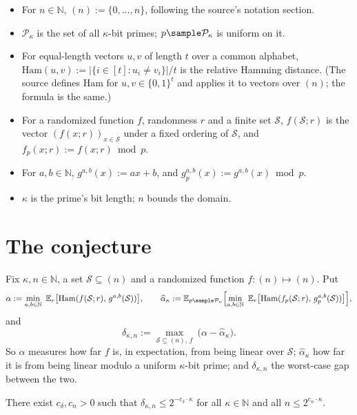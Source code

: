 \documentclass{conjura-conjecture}
\newcommand{\N}{\mathbb{N}}
\newcommand{\Ham}{\mathrm{Ham}}
\newcommand{\Prm}{\mathcal{P}}
\newcommand{\Sc}{\mathcal{S}}
\begin{document}
\begin{itemize}[nosep]
  \item For $n \in \N$, $(n) := \{0, \dots, n\}$, following the source's
    notation section.
  \item $\Prm_{\kappa}$ is the set of all $\kappa$-bit primes; $p
    \sample \Prm_{\kappa}$ is uniform on it.
  \item For equal-length vectors $u, v$ of length $t$ over a common
    alphabet, $\Ham(u,v) := |\{i \in [t] : u_{i} \ne v_{i}\}| / t$ is
    the relative Hamming distance. (The source defines $\Ham$ for $u, v
    \in \{0,1\}^{t}$ and applies it to vectors over $(n)$; the formula is
    the same.)
  \item For a randomized function $f$, randomness $r$ and a finite set
    $\Sc$, $f(\Sc; r)$ is the vector $(f(x;r))_{x \in \Sc}$ under a fixed
    ordering of $\Sc$, and $f_{p}(x;r) := f(x;r) \bmod p$.
  \item For $a, b \in \N$, $g^{a,b}(x) := ax + b$, and $g^{a,b}_{p}(x) :=
    g^{a,b}(x) \bmod p$.
  \item $\kappa$ is the prime's bit length; $n$ bounds the domain.
\end{itemize}

\section{The conjecture}\label{sec:conjectures}

\begin{definition}\label{def:distance}
Fix $\kappa, n \in \N$, a set $\Sc \subseteq (n)$ and a randomized
function $f : (n) \mapsto (n)$. Put
\[
  \alpha := \min_{a,b \in \N}\ \mathbb{E}_{r}\bigl[
    \Ham(f(\Sc;r),\, g^{a,b}(\Sc)) \bigr],
  \qquad
  \widehat{\alpha}_{\kappa} := \mathbb{E}_{p \sample \Prm_{\kappa}}
    \Bigl[ \min_{a,b \in \N}\ \mathbb{E}_{r}\bigl[
    \Ham(f_{p}(\Sc;r),\, g^{a,b}_{p}(\Sc)) \bigr] \Bigr],
\]
and
\[
  \delta_{\kappa,n} := \max_{\Sc \subseteq (n),\, f}\
  \bigl( \alpha - \widehat{\alpha}_{\kappa} \bigr).
\]
So $\alpha$ measures how far $f$ is, in expectation, from being linear
over $\Sc$; $\widehat{\alpha}_{\kappa}$ how far it is from being linear
modulo a uniform $\kappa$-bit prime; and $\delta_{\kappa,n}$ the
worst-case gap between the two.
\end{definition}

\begin{conjecture}\label{conj:main}
There exist $c_{\delta}, c_{n} > 0$ such that $\delta_{\kappa,n} \le
2^{-c_{\delta} \cdot \kappa}$ for all $\kappa \in \N$ and all $n \le
2^{c_{n} \cdot \kappa}$.
\end{conjecture}
\end{document}
